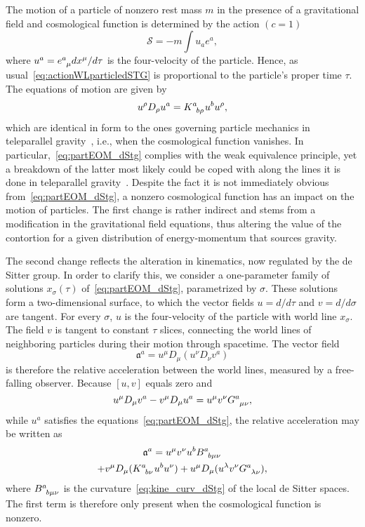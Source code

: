 \documentclass[%
aps,
prd,
reprint
]{revtex4-1}
\newcommand{\ind}{\indices}
\def\mf{\mathfrak}
\def\mc{\mathcal}
\begin{document}
The motion of a particle of nonzero rest mass $m$ in the presence 
of a gravitational field and cosmological function is determined 
by the action $(c = 1)$
\begin{equation}
\label{eq:actionWLparticledSTG}
  \mc{S} = -m \int u_a e^a,
\end{equation}
where $u^a = e\ind{^a_\mu} dx^\mu/d\tau$ is the four-velocity of 
the particle. Hence, as usual~\eqref{eq:actionWLparticledSTG} is 
proportional to the particle's proper time $\tau$. The equations 
of motion are given by
\begin{equation}
\label{eq:partEOM_dStg}
  u^\rho D_\rho u^a = K\ind{^a_{b\rho}} u^b u^\rho,
\end{equation}
which are identical in form to the ones governing particle 
mechanics in teleparallel gravity~\cite{deAndrade:1997qt}, i.e., 
when the cosmological function vanishes. In 
particular,~\eqref{eq:partEOM_dStg} complies with the weak 
equivalence principle, yet a breakdown of the latter most likely 
could be coped with along the lines it is done in teleparallel 
gravity~\cite{Aldrovandi:2003pa}. Despite the fact it is not 
immediately obvious from~\eqref{eq:partEOM_dStg}, a nonzero 
cosmological function has an impact on the motion of particles.  
The first change is rather indirect and stems from a modification 
in the gravitational field equations, thus altering the value of 
the contortion for a given distribution of energy-momentum that 
sources gravity. 

The second change reflects the alteration in kinematics, now 
regulated by the de Sitter group. In order to clarify this, we 
consider a one-parameter family of solutions $x_\sigma(\tau)$ 
of~\eqref{eq:partEOM_dStg}, parametrized by $\sigma$.  These 
solutions form a two-dimensional surface, to which the vector 
fields $u = d/d\tau$ and $v = d/d\sigma$ are tangent. For every 
$\sigma$, $u$ is the four-velocity of the particle with world 
line $x_\sigma$. The field $v$ is tangent to constant $\tau$ 
slices, connecting the world lines of neighboring particles 
during their motion through spacetime. The vector 
field~\cite{carroll:sg}
\begin{equation*}
  \mf{a}^a = u^\mu D_\mu (u^\nu D_\nu v^a)
\end{equation*}
is therefore the relative acceleration between the world lines, 
measured by a free-falling observer. Because $[u,v]$ equals zero 
and
\begin{equation*}
u^\mu D_\mu v^a - v^\mu D_\mu u^a = u^\mu v^\nu 
G\ind{^a_{\mu\nu}},
\end{equation*}
while $u^a$ satisfies the equations~\eqref{eq:partEOM_dStg}, the 
relative acceleration may be written as
\begin{multline}
\label{eq:rel_acc_dStg}
  \mf{a}^a = u^\mu v^\nu u^b B\ind{^a_{b\mu\nu}} \\
  + v^\mu D_\mu (K\ind{^a_{b\nu}} u^b u^\nu) + u^\mu D_\mu 
  (u^\lambda v^\nu G\ind{^a_{\lambda\nu}}),
\end{multline}
where $B\ind{^a_{b\mu\nu}}$ is the
curvature~\eqref{eq:kine_curv_dStg} of the local de Sitter 
spaces. The first term is therefore only present when the 
cosmological function is nonzero.
\end{document}
